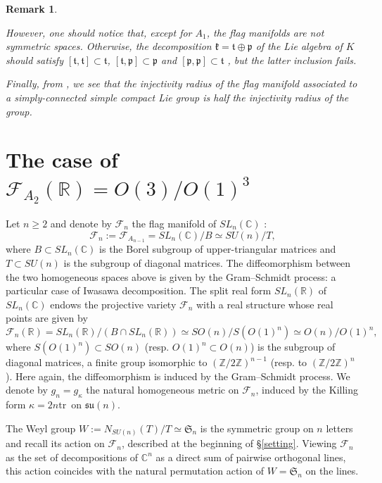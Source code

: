 \documentclass[11pt,twoside]{amsart}
\theoremstyle{plain}
\newtheorem{rem}[prop]{Remark}
\newcommand{\C}{{\mathbb C}}
\newcommand{\R}{{\mathbb R}}
\newcommand{\Z}{{\mathbb Z}}
\newcommand{\tr}{\mathrm{tr}\,}
\newcommand{\Sym}{\mathfrak{S}}
\begin{document}
\begin{rem}
\begin{itemize}
However, one should notice that, except for $A_1$, the flag manifolds are \emph{not} symmetric spaces. Otherwise, the decomposition $\mathfrak{k}=\mathfrak{t}\oplus\mathfrak{p}$ of the Lie algebra of $K$ should satisfy $[\mathfrak{t},\mathfrak{t}]\subset\mathfrak{t}$, $[\mathfrak{t},\mathfrak{p}]\subset\mathfrak{p}$ and $[\mathfrak{p},\mathfrak{p}]\subset\mathfrak{t}$ \cite[Lemma 7.69]{besse_einstein}, but the latter inclusion fails.%

Finally, from \cite[Table 4.2]{yang1}, we see that the injectivity radius of the flag manifold associated to a simply-connected simple compact Lie group is half the injectivity radius of the group.
\end{itemize}
\end{rem}





\section{The case of $\mathcal{F}_{A_2}(\R)=O(3)/O(1)^3$}\label{O(3)/O(1)3}

Let $n\ge2$ and denote by $\mathcal{F}_n$ the flag manifold of $SL_n(\C)$ :
\[\mathcal{F}_n:=\mathcal{F}_{A_{n-1}}=SL_n(\C)/B\simeq SU(n)/T,\]
where $B\subset SL_n(\C)$ is the Borel subgroup of upper-triangular matrices and $T\subset SU(n)$ is the subgroup of diagonal matrices. The diffeomorphism between the two homogeneous spaces above is given by the Gram--Schmidt process: a particular case of Iwasawa decomposition. The split real form $SL_n(\R)$ of $SL_n(\C)$ endows the projective variety $\mathcal{F}_n$ with a real structure whose real points are given by
\[\mathcal{F}_n(\R)=SL_n(\R)/(B\cap SL_n(\R))\simeq SO(n)/S(O(1)^n)\simeq O(n)/O(1)^n,\]
where $S(O(1)^n)\subset SO(n)$ (resp. $O(1)^n\subset O(n)$) is the subgroup of diagonal matrices, a finite group isomorphic to $(\Z/2\Z)^{n-1}$ (resp. to $(\Z/2\Z)^n$). Here again, the diffeomorphism is induced by the Gram--Schmidt process. We denote by $g_n=g_\kappa$ the natural homogeneous metric on $\mathcal{F}_n$, induced by the Killing form $\kappa=2n\tr$ on $\mathfrak{su}(n)$.

The Weyl group $W:=N_{SU(n)}(T)/T\simeq\Sym_n$ is the symmetric group on $n$ letters and recall its action on $\mathcal{F}_n$, described at the beginning of \S \ref{setting}. Viewing $\mathcal{F}_n$ as the set of decompositions of $\C^n$ as a direct sum of pairwise orthogonal lines, this action coincides with the natural permutation action of $W=\Sym_n$ on the lines. %
\end{document}
